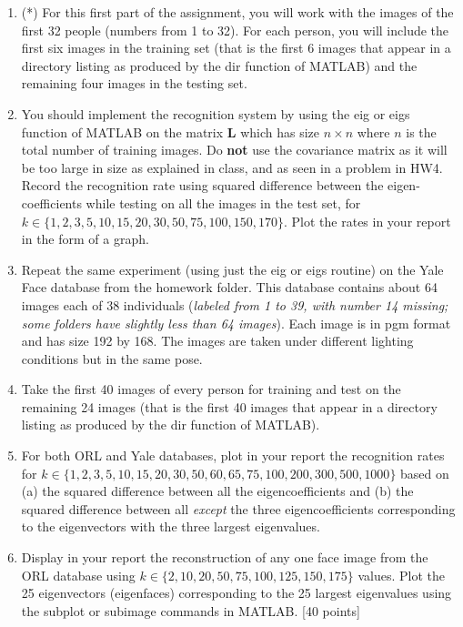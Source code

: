 \documentclass[11pt]{article}
\begin{document}
\begin{enumerate}
\begin{enumerate}
\item (*) For this first part of the assignment, you will work with the images of the first 32 people (numbers from 1 to 32). For each person, you will include the first six images in the training set (that is the first 6 images that appear in a directory listing as produced by the \textsf{dir} function of MATLAB) and the remaining four images in the testing set. 

\item You should implement the recognition system by using the \textsf{eig} or \textsf{eigs} function of MATLAB on the matrix $\boldsymbol{L}$ which has size $n \times n$ where $n$ is the total number of training images. Do \textbf{not} use the covariance matrix as it will be too large in size as explained in class, and as seen in a problem in HW4. Record the recognition rate using squared difference between the eigen-coefficients while testing on all the images in the test set, for $k \in \{1,2,3,5,10,15,20,30,50,75,100,150,170\}$. Plot the rates in your report in the form of a graph.

\item Repeat the same experiment (using just the \textsf{eig} or \textsf{eigs} routine) on the Yale Face database from the homework folder. This database contains about 64 images each of 38 individuals (\textit{labeled from 1 to 39, with number 14 missing; some folders have slightly less than 64 images}). Each image is in pgm format and has size 192 by 168. The images are taken under different lighting conditions but in the same pose. 

\item Take the first 40 images of every person for training and test on the remaining 24 images (that is the first 40 images that appear in a directory listing as produced by the \textsf{dir} function of MATLAB). 

\item For both ORL and Yale databases, plot in your report the recognition rates for $k \in \{1,2,3,5,10,15,20,30,50,60, 65,75,100,200,300,500,1000\}$ based on (a) the squared difference between all the eigencoefficients and (b) the squared difference between all \emph{except} the three eigencoefficients corresponding to the eigenvectors with the three largest eigenvalues. 

\item Display in your report the reconstruction of any one face image from the ORL database using $k \in \{2,10,20,50,75,100,125, 150,175\}$ values. Plot the 25 eigenvectors (eigenfaces) corresponding to the 25 largest eigenvalues using the subplot or subimage commands in MATLAB. \textsf{[40 points]}
\end{enumerate}

\end{enumerate}
\end{document}
